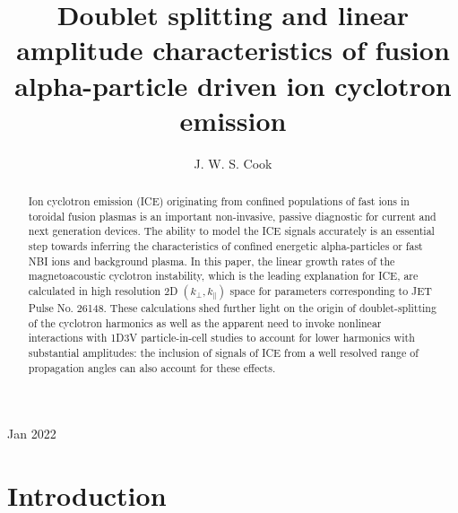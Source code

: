 \documentclass[12pt]{iopart}
\begin{document}
\title[]{Doublet splitting and linear amplitude characteristics of fusion alpha-particle driven ion cyclotron emission}

\author{J. W. S. Cook}

\address{UKAEA-CCFE, Culham Science Centre, Abingdon, OX14 3DB, UK}
\vspace{10pt}
\begin{indented}
\item[]Jan 2022
\end{indented}

\begin{abstract}
Ion cyclotron emission (ICE) originating from confined populations of fast ions
  in toroidal fusion plasmas is an important non-invasive, passive diagnostic
  for current and next generation devices. The ability to model the ICE signals
  accurately is an essential step towards inferring the characteristics of
  confined energetic alpha-particles or fast NBI ions and background plasma. In
  this paper, the linear growth rates of the magnetoacoustic cyclotron
  instability, which is the leading explanation for ICE, are calculated in high
  resolution 2D $(k_\perp, k_\parallel)$ space for parameters corresponding to
  JET Pulse No. 26148. These calculations shed further light on the origin of
  doublet-splitting of the cyclotron harmonics as well as the apparent need to
  invoke nonlinear interactions with 1D3V particle-in-cell studies to account
  for lower harmonics with substantial amplitudes: the inclusion of signals of
  ICE from a well resolved range of propagation angles can also account for
  these effects.
\end{abstract}

%
%
%
% 
%


\section{Introduction}
\end{document}
